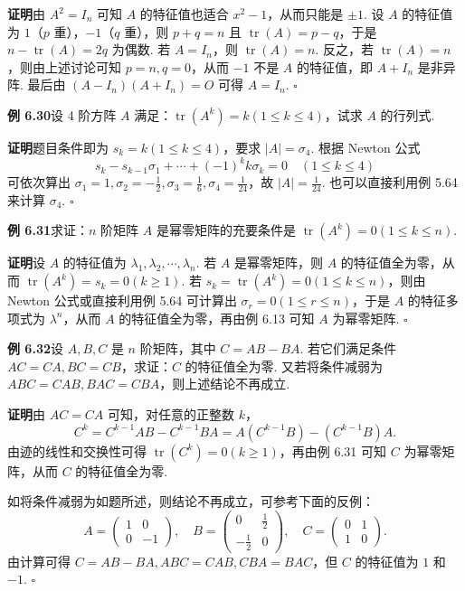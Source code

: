 \documentclass[UTF8,12pt,a4paper,fontset=fandol]{ctexart}
\begin{document}
\noindent\textbf{证明}\quad 由 $A^2=I_n$ 可知 $A$ 的特征值也适合 $x^2-1$，从而只能是 $\pm 1$. 设 $A$ 的特征值为 $1$（$p$ 重），$-1$（$q$ 重），则 $p+q=n$ 且 $\operatorname{tr}(A)=p-q$，于是 $n-\operatorname{tr}(A)=2q$ 为偶数. 若 $A=I_n$，则 $\operatorname{tr}(A)=n$. 反之，若 $\operatorname{tr}(A)=n$，则由上述讨论可知 $p=n,q=0$，从而 $-1$ 不是 $A$ 的特征值，即 $A+I_n$ 是非异阵. 最后由 $(A-I_n)(A+I_n)=O$ 可得 $A=I_n$. $\square$

\noindent\textbf{例 6.30}\quad 设 4 阶方阵 $A$ 满足：$\operatorname{tr}(A^k)=k(1\le k\le 4)$，试求 $A$ 的行列式.

\noindent\textbf{证明}\quad 题目条件即为 $s_k=k(1\le k\le 4)$，要求 $|A|=\sigma_4$. 根据 Newton 公式
\[
s_k-s_{k-1}\sigma_1+\cdots+(-1)^kk\sigma_k=0\quad (1\le k\le 4)
\]
可依次算出 $\sigma_1=1,\sigma_2=-\frac{1}{2},\sigma_3=\frac{1}{6},\sigma_4=\frac{1}{24}$，故 $|A|=\frac{1}{24}$. 也可以直接利用例 5.64 来计算 $\sigma_4$. $\square$

\noindent\textbf{例 6.31}\quad 求证：$n$ 阶矩阵 $A$ 是幂零矩阵的充要条件是 $\operatorname{tr}(A^k)=0(1\le k\le n)$.

\noindent\textbf{证明}\quad 设 $A$ 的特征值为 $\lambda_1,\lambda_2,\cdots,\lambda_n$. 若 $A$ 是幂零矩阵，则 $A$ 的特征值全为零，从而 $\operatorname{tr}(A^k)=s_k=0(k\ge 1)$. 若 $s_k=\operatorname{tr}(A^k)=0(1\le k\le n)$，则由 Newton 公式或直接利用例 5.64 可计算出 $\sigma_r=0(1\le r\le n)$，于是 $A$ 的特征多项式为 $\lambda^n$，从而 $A$ 的特征值全为零，再由例 6.13 可知 $A$ 为幂零矩阵. $\square$

\noindent\textbf{例 6.32}\quad 设 $A,B,C$ 是 $n$ 阶矩阵，其中 $C=AB-BA$. 若它们满足条件 $AC=CA,BC=CB$，求证：$C$ 的特征值全为零. 又若将条件减弱为 $ABC=CAB,BAC=CBA$，则上述结论不再成立.

\noindent\textbf{证明}\quad 由 $AC=CA$ 可知，对任意的正整数 $k$，
\[
C^k=C^{k-1}AB-C^{k-1}BA=A(C^{k-1}B)-(C^{k-1}B)A.
\]
由迹的线性和交换性可得 $\operatorname{tr}(C^k)=0(k\ge 1)$，再由例 6.31 可知 $C$ 为幂零矩阵，从而 $C$ 的特征值全为零.

如将条件减弱为如题所述，则结论不再成立，可参考下面的反例：
\[
A=\left(\begin{array}{cc}
1 & 0\\
0 & -1
\end{array}\right),\quad
B=\left(\begin{array}{cc}
0 & \frac{1}{2}\\
-\frac{1}{2} & 0
\end{array}\right),\quad
C=\left(\begin{array}{cc}
0 & 1\\
1 & 0
\end{array}\right).
\]
由计算可得 $C=AB-BA,ABC=CAB,CBA=BAC$，但 $C$ 的特征值为 $1$ 和 $-1$. $\square$
\end{document}
